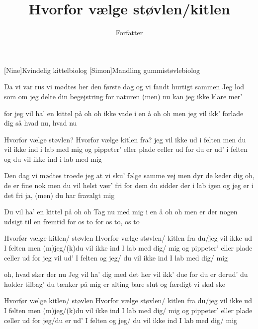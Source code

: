 \documentclass[a4paper,11pt]{article}
\title{Hvorfor vælge støvlen/kitlen}
\author{Forfatter}
\begin{document}
\maketitle

\begin{roles}
[Nine]Kvindelig kittelbiolog
[Simon]Mandling gummistøvlebiolog
\end{roles}

\begin{song}
	 Da vi var rus
        vi mødtes her
        den første dag
	og vi fandt hurtigt sammen
	Jeg lod som om jeg delte din
	begejstring for naturen
	(men) nu kan jeg  ikke klare mer’

	for jeg vil ha’ en kittel på oh oh
	ikke vade i en å oh oh
	men jeg vil ikk’ forlade dig
	så hvad nu, hvad nu

	Hvorfor vælge støvlen?
	Hvorfor vælge kitlen fra?
        jeg vil ikke ud i felten men du
	vil ikke ind i lab med mig
        og pippeter’
	eller plade celler ud for du er
        ud’ i felten og du
	vil ikke ind i lab med mig

	 Den dag vi mødtes troede jeg
	at vi sku’ følge samme vej
        men dyr de keder dig
         oh, de er fine nok
	 men du vil helst vær’ fri for dem
	du sidder der i lab igen
	og jeg er i det fri
	 ja, (men) du har fravalgt mig

	Du vil ha’ en kittel på oh oh
	Tag nu med mig i en å oh oh 
	 men er der nogen udsigt til
        en fremtid for os to
	for os to, os to

	 Hvorfør vælge kitlen/ støvlen
	Hvorfor vælge  støvlen/ kitlen fra
	du/jeg vil ikke ud I felten men (m)jeg/(k)du
	vil ikke ind I lab med  dig/ mig
         og pippeter’
	eller plade celler ud for jeg vil
         ud’ I felten og  jeg/ du
	vil ikke ind I lab med  dig/ mig

	 oh, hvad sker der nu
         Jeg vil ha’ dig med
	 det her vil ikk’ due
	for du er derud’
	 du holder tilbag’
	 du tænker på mig
	 er alting bare slut og færdigt
         vi skal ske

	 Hvorfør vælge kitlen/ støvlen
	Hvorfor vælge  støvlen/ kitlen fra
 	du/jeg vil ikke ud I felten men (m)jeg/(k)du
	vil ikke ind I lab med  dig/ mig
        og pippeter’
	eller plade celler ud for jeg/du er
        ud’ I felten og  jeg/ du
	vil ikke ind I lab med  dig/ mig


\end{song}
\end{document}
